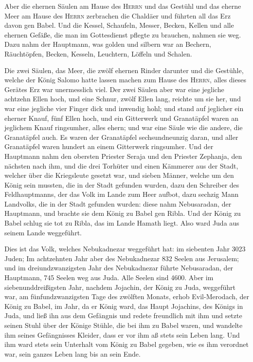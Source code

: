  Aber die ehernen Säulen am Hause des \textsc{Herrn} und
das Gestühl und das eherne Meer am Hause des \textsc{Herrn} zerbrachen
die Chaldäer und führten all das Erz davon gen Babel. 
Und die Kessel, Schaufeln, Messer, Becken, Kellen und alle ehernen
Gefäße, die man im Gottesdienst pflegte zu brauchen, nahmen sie weg.
 Dazu nahm der Hauptmann, was golden und silbern war an
Bechern, Räuchtöpfen, Becken, Kesseln, Leuchtern, Löffeln und Schalen.

 Die zwei Säulen, das Meer, die zwölf ehernen Rinder
darunter und die Gestühle, welche der König Salomo hatte lassen machen
zum Hause des \textsc{Herrn}, alles dieses Gerätes Erz war unermesslich
viel.  Der zwei Säulen aber war eine jegliche achtzehn
Ellen hoch, und eine Schnur, zwölf Ellen lang, reichte um sie her, und
war eine jegliche vier Finger dick und inwendig hohl; 
und stand auf jeglicher ein eherner Knauf, fünf Ellen hoch, und ein
Gitterwerk und Granatäpfel waren an jeglichem Knauf ringsumher, alles
ehern; und war eine Säule wie die andere, die Granatäpfel auch.
 Es waren der Granatäpfel sechsundneunzig daran, und
aller Granatäpfel waren hundert an einem Gitterwerk ringsumher.
 Und der Hauptmann nahm den obersten Priester Seraja und
den Priester Zephanja, den nächsten nach ihm, und die drei Torhüter
 und einen Kämmerer aus der Stadt, welcher über die
Kriegsleute gesetzt war, und sieben Männer, welche um den König sein
mussten, die in der Stadt gefunden wurden, dazu den Schreiber des
Feldhauptmanns, der das Volk im Lande zum Heer aufbot, dazu sechzig Mann
Landvolks, die in der Stadt gefunden wurden:  diese nahm
Nebusaradan, der Hauptmann, und brachte sie dem König zu Babel gen
Ribla.  Und der König zu Babel schlug sie tot zu Ribla,
das im Lande Hamath liegt. Also ward Juda aus seinem Lande weggeführt.

 Dies ist das Volk, welches Nebukadnezar weggeführt hat:
im siebenten Jahr 3023 Juden;  Im achtzehnten Jahr aber
des Nebukadnezar 832 Seelen aus Jerusalem;  und im
dreiundzwanzigsten Jahr des Nebukadnezar führte Nebusaradan, der
Hauptmann, 745 Seelen weg aus Juda. Alle Seelen sind 4600.
 Aber im siebenunddreißigsten Jahr, nachdem Jojachin, der
König zu Juda, weggeführt war, am fünfundzwanzigsten Tage des zwölften
Monats, erhob Evil-Merodach, der König zu Babel, im Jahr, da er König
ward, das Haupt Jojachins, des Königs in Juda, und ließ ihn aus dem
Gefängnis  und redete freundlich mit ihm und setzte
seinen Stuhl über der Könige Stühle, die bei ihm zu Babel waren,
 und wandelte ihm seines Gefängnisses Kleider, dass er
vor ihm aß stets sein Leben lang.  Und ihm ward stets
sein Unterhalt vom König zu Babel gegeben, wie es ihm verordnet war,
sein ganzes Leben lang bis an sein Ende.
